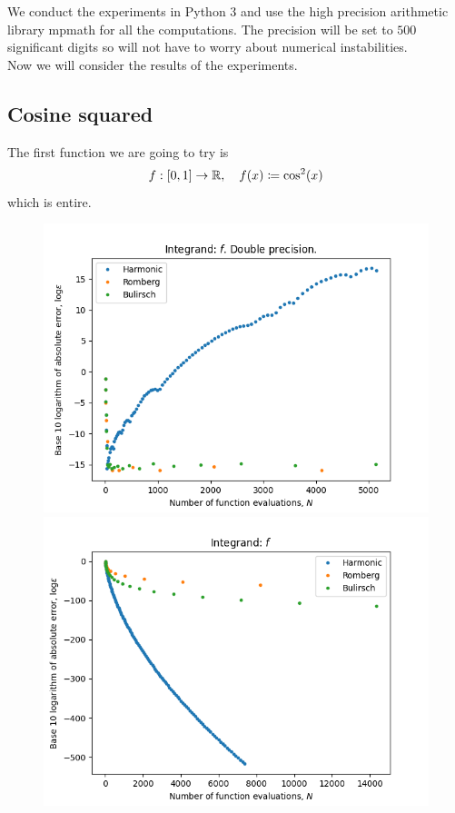 We conduct the experiments in Python 3 and use the high precision arithmetic library mpmath for all the computations. The precision will be set to \(500\) significant digits so will not have to worry about numerical instabilities.\\

Now we will consider the results of the experiments.

\subsection{Cosine squared}
The first function we are going to try is
\[
f: [0, 1]\rightarrow \mathbb{R}, \quad f(x) \coloneqq \cos^2(x)
\]
which is entire.

\begin{figure}[H]
\centering
\begin{minipage}{0.45\textwidth}
\centering
\includegraphics[scale=0.45]{../results/romberg_plots/cos_squared.png}
\end{minipage}
\begin{minipage}{0.45\textwidth}
\centering
\includegraphics[scale=0.45]{../results/romberg_plots/cos_squared_hp.png}
\end{minipage}
\end{figure}

